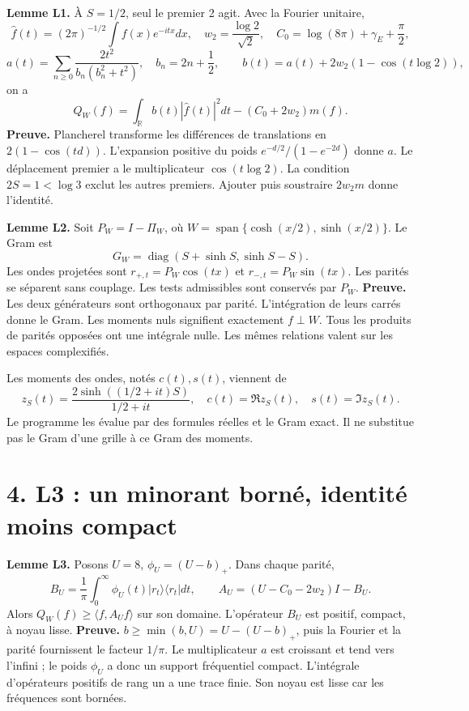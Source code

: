 \documentclass[
  10pt,
  a4paper,
]{article}
\begin{document}
\textbf{Lemme L1.} À \(S=1/2\), seul le premier 2 agit. Avec la Fourier
unitaire, \[
\widehat f(t)=(2\pi)^{-1/2}\int f(x)e^{-itx}dx,
\quad w_2=\frac{\log2}{\sqrt2},\quad
C_0=\log(8\pi)+\gamma_E+\frac\pi2,
\] \[
a(t)=\sum_{n\ge0}\frac{2t^2}{b_n(b_n^2+t^2)},\quad b_n=2n+\frac12,
\qquad b(t)=a(t)+2w_2(1-\cos(t\log2)),
\] on a \[
Q_W(f)=\int_{\mathbb R}b(t)|\widehat f(t)|^2dt-(C_0+2w_2)m(f).
\] \textbf{Preuve.} Plancherel transforme les différences de
translations en \(2(1-\cos(td))\). L'expansion positive du poids
\(e^{-d/2}/(1-e^{-2d})\) donne \(a\). Le déplacement premier a le
multiplicateur \(\cos(t\log2)\). La condition \(2S=1<\log3\) exclut les
autres premiers. Ajouter puis soustraire \(2w_2m\) donne l'identité.

\textbf{Lemme L2.} Soit \(P_W=I-\Pi_W\), où
\(W=\operatorname{span}\{\cosh(x/2),\sinh(x/2)\}\). Le Gram est \[
G_W=\operatorname{diag}(S+\sinh S,\sinh S-S).
\] Les ondes projetées sont \(r_{+,t}=P_W\cos(tx)\) et
\(r_{-,t}=P_W\sin(tx)\). Les parités se séparent sans couplage. Les
tests admissibles sont conservés par \(P_W\). \textbf{Preuve.} Les deux
générateurs sont orthogonaux par parité. L'intégration de leurs carrés
donne le Gram. Les moments nuls signifient exactement \(f\perp W\). Tous
les produits de parités opposées ont une intégrale nulle. Les mêmes
relations valent sur les espaces complexifiés.

Les moments des ondes, notés \(c(t),s(t)\), viennent de \[
z_S(t)=\frac{2\sinh((1/2+it)S)}{1/2+it},\quad
c(t)=\Re z_S(t),\quad s(t)=\Im z_S(t).
\] Le programme les évalue par des formules réelles et le Gram exact. Il
ne substitue pas le Gram d'une grille à ce Gram des moments.

\hypertarget{l3-un-minorant-bornuxe9-identituxe9-moins-compact}{%
\section{4. L3 : un minorant borné, identité moins
compact}\label{l3-un-minorant-bornuxe9-identituxe9-moins-compact}}

\textbf{Lemme L3.} Posons \(U=8\), \(\phi_U=(U-b)_+\). Dans chaque
parité, \[
B_U=\frac1\pi\int_0^\infty\phi_U(t)
|r_t\rangle\langle r_t|dt,
\qquad A_U=(U-C_0-2w_2)I-B_U.
\] Alors \(Q_W(f)\ge\langle f,A_Uf\rangle\) sur son domaine. L'opérateur
\(B_U\) est positif, compact, à noyau lisse. \textbf{Preuve.}
\(b\ge\min(b,U)=U-(U-b)_+\), puis la Fourier et la parité fournissent le
facteur \(1/\pi\). Le multiplicateur \(a\) est croissant et tend vers
l'infini ; le poids \(\phi_U\) a donc un support fréquentiel compact.
L'intégrale d'opérateurs positifs de rang un a une trace finie. Son
noyau est lisse car les fréquences sont bornées.
\end{document}
